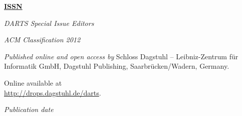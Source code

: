 \documentclass[a4paper,UKenglish]{dartsmaster-v2019}
\begin{document}
\frontmatter


\maketitle


\begin{publicationinfo}%
\sffamily
\twocolumn

{\Large\bf\sffamily \textbf{\href{http://www.dagstuhl.de/lites}{ISSN \printISSN{}}}}

\bigskip

\newcommand{\orcid}[1]{\url{http://orcid.org/#1}}
\newcommand{\email}[1]{\href{mailto:#1}{\texttt{#1}}}

\emph{DARTS Special Issue Editors} \\[0.2cm]
\printEditorLong

\bigskip
\emph{ACM Classification 2012}\\
\printSubjclass

\bigskip

\emph{Published online and open access by}\newline
Schloss Dagstuhl -- Leibniz-Zentrum f\"ur Informatik GmbH, Dagstuhl Publishing, Saarbr\"ucken/Wadern, Germany. 

Online available at \\ \url{http://drops.dagstuhl.de/darts}.

\bigskip
\emph{Publication date}\newline
\printDatePublished{}



\bigskip


\bigskip


\end{publicationinfo}
\end{document}
